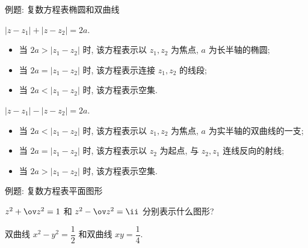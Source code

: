 \begin{frame}{例题: 复数方程表椭圆和双曲线}
	\onslide<+->
	\begin{example}
		$|z-z_1|+|z-z_2|=2a$.
		\begin{itemize}
			\item 当 $2a>|z_1-z_2|$ 时, 该方程表示以 $z_1,z_2$ 为焦点, $a$ 为长半轴的椭圆;
			\item 当 $2a=|z_1-z_2|$ 时, 该方程表示连接 $z_1,z_2$ 的线段;
			\item 当 $2a<|z_1-z_2|$ 时, 该方程表示空集.
		\end{itemize}
	\end{example}
	\onslide<+->
	\begin{example}
		$|z-z_1|-|z-z_2|=2a$.
		\begin{itemize}
			\item 当 $2a<|z_1-z_2|$ 时, 该方程表示以 $z_1,z_2$ 为焦点, $a$ 为实半轴的双曲线的一支;
			\item 当 $2a=|z_1-z_2|$ 时, 该方程表示以 $z_2$ 为起点, 与 $z_2,z_1$ 连线反向的射线;
			\item 当 $2a>|z_1-z_2|$ 时, 该方程表示空集.	
		\end{itemize}
	\end{example}
\end{frame}


\begin{frame}{例题: 复数方程表平面图形}
	\onslide<+->
	\begin{exercise}[nearnext]
		$z^2+\ov z^2=1$ 和 $z^2-\ov z^2=\ii$ 分别表示什么图形?
	\end{exercise}

	\onslide<+->
	\begin{answer}[nearprev]
		双曲线 $x^2-y^2=\dfrac12$ 和双曲线 $xy=\dfrac14$.
	\end{answer}
\end{frame}


